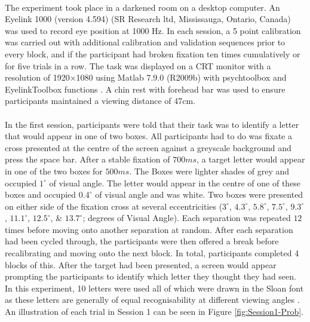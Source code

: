 \documentclass[12pt]{article}
\begin{document}
\paragraph{} The experiment took place in a darkened room on a desktop computer. An Eyelink 1000 (version 4.594) (SR Research ltd, Mississauga, Ontario, Canada) was used to record eye position at 1000 Hz. In each session, a 5 point calibration was carried out with additional calibration and validation sequences prior to every block, and if the participant had broken fixation ten times cumulatively or for five trials in a row. The task was displayed on a CRT monitor with a resolution of 1920$\times$1080 using Matlab 7.9.0 (R2009b) with psychtoolbox \citep{brainard1997psychophysics,pelli1997videotoolbox} and EyelinkToolbox functions \cite{cornelissen2002eyelink}. A chin rest with forehead bar was used to ensure participants maintained a viewing distance of 47cm. 

\paragraph{} In the first session, participants were told that their task was to identify a letter that would appear in one of two boxes. All participants had to do was fixate a cross presented at the centre of the screen against a greyscale background and press the space bar. After a stable fixation of $700ms$, a target letter would appear in one of the two boxes for $500ms$. The Boxes were lighter shades of grey and occupied $1^{\circ}$ of visual angle. The letter would appear in the centre of one of these boxes and occupied $0.4^{\circ}$ of visual angle and was white. Two boxes were presented on either side of the fixation cross at several eccentricities ($3^{\circ}$, $4.3^{\circ}$, $5.8^{\circ}$, $7.5^{\circ}$, $9.3^{\circ}$, $11.1^{\circ}$, $12.5^{\circ}$, \& $13.7^{\circ}$; degrees of Visual Angle). Each separation was repeated $12$ times before moving onto another separation at random. After each separation had been cycled through, the participants were then offered a break before recalibrating and moving onto the next block. In total, participants completed 4 blocks of this. After the target had been presented, a screen would appear prompting the participants to identify which letter they thought they had seen. In this experiment, 10 letters were used all of which were drawn in the Sloan font as these letters are generally of equal recognisability at different viewing angles \citep{sloan1952comparison}. An illustration of each trial in Session 1 can be seen in Figure \ref{fig:Session1-Prob}.
\end{document}

